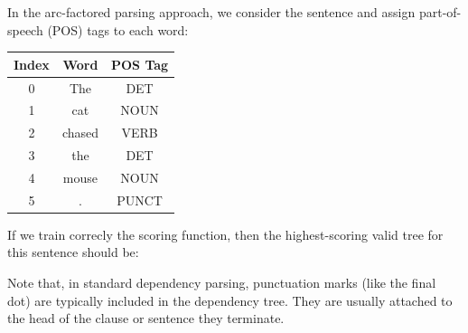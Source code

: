 \begin{example}{}
In the arc-factored parsing approach, we consider the sentence  and assign part-of-speech (POS) tags to each word:

\begin{center}
\begin{tabular}{c c c}
\hline
Index & Word & POS Tag \\
\hline
0 & The & DET \\
1 & cat & NOUN \\
2 & chased & VERB \\
3 & the & DET \\
4 & mouse & NOUN \\
5 & . & PUNCT \\
\end{tabular}
\end{center}

If we train correcly the scoring function, then the highest-scoring valid tree for this sentence should be:

\begin{center}
\end{center}
Note that, in standard dependency parsing, punctuation marks (like the final dot) are typically included in the dependency tree. They are usually attached to the head of the clause or sentence they terminate.
\end{example}
